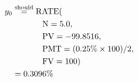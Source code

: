\begin{align*}
y_{0}&\overset{\text{should}}{=}\text{RATE}(\\
	&\hspace{.5in}\text{N}=5.0,\\
	&\hspace{.5in}\text{PV}=-99.8516,\\
	&\hspace{.5in}\text{PMT}=(0.25\%\times 100)/2,\\
	&\hspace{.5in}\text{FV}=100)\\
	&=0.3096\%
\end{align*}
